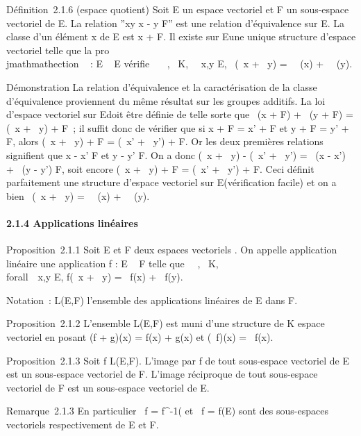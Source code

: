 \documentclass[]{article}
\begin{document}
Définition~2.1.6 (espace quotient) Soit E un espace vectoriel et F un
sous-espace vectoriel de E. La relation ''xy
\Leftrightarrow x - y \in F'' est une relation d'équivalence
sur E. La classe d'un élément x de E est x + F. Il existe sur E\diagupF une
unique structure d'espace vectoriel telle que la pro\\jmathmathection \pi~ : E \rightarrow~ E\diagupF
vérifie \forall~~\alpha~,\beta~ \in K,
\forall~~x,y \in E, \pi~(\alpha~x + \beta~y) = \alpha~\pi~(x) + \beta~\pi~(y).

Démonstration La relation d'équivalence et la caractérisation de la
classe d'équivalence proviennent du même résultat sur les groupes
additifs. La loi d'espace vectoriel sur E\diagupF doit être définie de telle
sorte que \alpha~(x + F) + \beta~(y + F) = (\alpha~x + \beta~y) + F~; il suffit donc de
vérifier que si x + F = x' + F et y + F = y' + F, alors (\alpha~x + \beta~y) + F =
(\alpha~x' + \beta~y') + F. Or les deux premières relations signifient que x - x' \in
F et y - y' \in F. On a donc (\alpha~x + \beta~y) - (\alpha~x' + \beta~y') = \alpha~(x - x') + \beta~(y -
y') \in F, soit encore (\alpha~x + \beta~y) + F = (\alpha~x' + \beta~y') + F. Ceci définit
parfaitement une structure d'espace vectoriel sur E\diagupF (vérification
facile) et on a bien \pi~(\alpha~x + \beta~y) = \alpha~\pi~(x) + \beta~\pi~(y).

\paragraph{2.1.4 Applications linéaires}

Proposition~2.1.1 Soit E et F deux espaces vectoriels . On appelle
application linéaire une application f : E \rightarrow~ F telle que
\forall~\alpha~,\beta~ \in K, \\forall~~x,y \in E,
f(\alpha~x + \beta~y) = \alpha~f(x) + \beta~f(y).

Notation~: L(E,F) l'ensemble des applications linéaires de E dans F.

Proposition~2.1.2 L'ensemble L(E,F) est muni d'une structure de K espace
vectoriel en posant (f + g)(x) = f(x) + g(x) et (\lambda~f)(x) = \lambda~f(x).

Proposition~2.1.3 Soit f \in L(E,F). L'image par f de tout sous-espace
vectoriel de E est un sous-espace vectoriel de F. L'image réciproque de
tout sous-espace vectoriel de F est un sous-espace vectoriel de E.

Remarque~2.1.3 En particulier
\mathrmKer~f =
f^-1(\0\) et
\mathrmIm~f = f(E) sont des
sous-espaces vectoriels respectivement de E et F.
\end{document}
